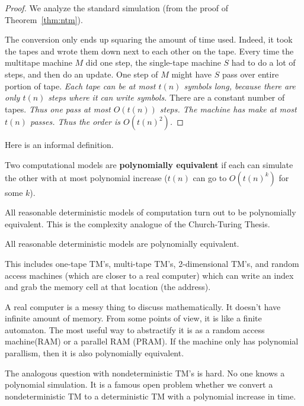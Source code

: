 
\begin{proof}
We analyze the standard simulation (from the proof of Theorem~\ref{thm:ntm}).

The conversion only ends up squaring the amount of time used. Indeed, it took the tapes and wrote them down next to each other on the tape. Every time the multitape machine $M$ did one step, the single-tape machine $S$ had to do a lot of steps, and then do an update. One step of $M$ might have $S$ pass over entire portion of tape. {\it Each tape can be at most $t(n)$ symbols long, because there are only $t(n)$ steps where it can write symbols.} There are a constant number of tapes. {\it Thus one pass at most $O(t(n))$ steps. The machine has make at most $t(n)$ passes. Thus the order is $O(t(n)^2)$.}

\end{proof}
Here is an informal definition.
\begin{df}
Two computational models are \textbf{polynomially equivalent} if each can simulate the other with at most polynomial increase ($t(n)$ can go to $O(t(n)^k)$ for some $k$).
\end{df}
All reasonable deterministic models of computation turn out to be polynomially equivalent. This is the complexity analogue of the Church-Turing Thesis. 
\begin{ax}
All reasonable deterministic models are polynomially equivalent.
\end{ax}
This includes one-tape TM's, multi-tape TM's, 2-dimensional TM's, and random access machines (which are closer to a real computer) which can write an index and grab the memory cell at that location (the address).

A real computer is a messy thing to discuss mathematically. It doesn't have infinite amount of memory. From some points of view, it is like a finite automaton. The most useful way to abstractify it is as a random access machine(RAM) or a parallel RAM (PRAM). If the machine only has polynomial parallism, then it is also polynomially equivalent.

The analogous question with nondeterministic TM's is hard. No one knows a polynomial simulation. It is a famous open problem whether we convert a nondeterministic TM to a deterministic TM with a polynomial increase in time.

